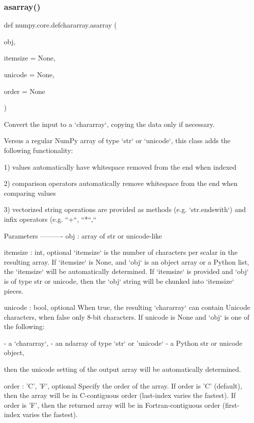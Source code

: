 \subsubsection{\texorpdfstring{asarray()}{asarray()}}
{\footnotesize\ttfamily def numpy.\+core.\+defchararray.\+asarray (\begin{DoxyParamCaption}\item[{}]{obj,  }\item[{}]{itemsize = {\ttfamily None},  }\item[{}]{unicode = {\ttfamily None},  }\item[{}]{order = {\ttfamily None} }\end{DoxyParamCaption})}

\begin{DoxyVerb}Convert the input to a `chararray`, copying the data only if
necessary.

Versus a regular NumPy array of type `str` or `unicode`, this
class adds the following functionality:

  1) values automatically have whitespace removed from the end
     when indexed

  2) comparison operators automatically remove whitespace from the
     end when comparing values

  3) vectorized string operations are provided as methods
     (e.g. `str.endswith`) and infix operators (e.g. ``+``, ``*``,``%

Parameters
----------
obj : array of str or unicode-like

itemsize : int, optional
    `itemsize` is the number of characters per scalar in the
    resulting array.  If `itemsize` is None, and `obj` is an
    object array or a Python list, the `itemsize` will be
    automatically determined.  If `itemsize` is provided and `obj`
    is of type str or unicode, then the `obj` string will be
    chunked into `itemsize` pieces.

unicode : bool, optional
    When true, the resulting `chararray` can contain Unicode
    characters, when false only 8-bit characters.  If unicode is
    None and `obj` is one of the following:

      - a `chararray`,
      - an ndarray of type `str` or 'unicode`
      - a Python str or unicode object,

    then the unicode setting of the output array will be
    automatically determined.

order : {'C', 'F'}, optional
    Specify the order of the array.  If order is 'C' (default), then the
    array will be in C-contiguous order (last-index varies the
    fastest).  If order is 'F', then the returned array
    will be in Fortran-contiguous order (first-index varies the
    fastest).
\end{DoxyVerb}
 \mbox{\label{namespacenumpy_1_1core_1_1defchararray_a90aac2c88f442f50844f1635280a3154}} 

